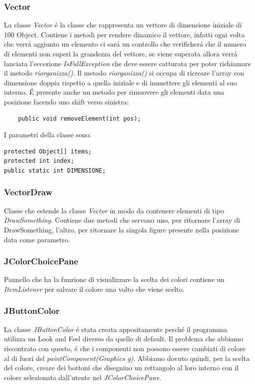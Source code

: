 \documentclass[a4paper,12pt,times,numbered,print,index]{article}
\begin{document}
\subsubsection{Vector}
La classe \textit{Vector} é la classe che rappresenta un vettore di dimensione iniziale di 100 Object. Contiene i metodi per rendere dinamico il vettore, infatti ogni volta che verrá aggiunto un elemento ci sará un controllo che verificherá che il numero di elementi non superi la grandezza del vettore, se viene superata allora verrá lanciata l'eccezione \textit{IsFullException} che deve essere catturata per poter richiamare il metodo \textit{riorganizza()}. Il metodo \textit{riorganizza()} si occupa di ricreare l'array con dimensione doppia rispetto a quella iniziale e di immettere gli elementi al suo interno.
É presente anche un metodo per rimuovere gli elementi data una posizione facendo uno shift verso sinistra:
\begin{lstlisting}
	public void removeElement(int pos);
\end{lstlisting}
I parametri della classe sono:
\begin{lstlisting}
protected Object[] items;
protected int index;
public static int DIMENSIONE;
\end{lstlisting}

\subsubsection{VectorDraw}
Classe che estende la classe \textit{Vector} in modo da contenere elementi di tipo \textit{DrawSomething}.
Contiene due metodi che servono uno, per ritornare l'array di DrawSomething, l'altro, per ritornare la singola figure presente nella posizione data come parametro.
\subsubsection{JColorChoicePane}
Pannello che ha la funzione di visualizzare la scelta dei colori contiene un \textit{ItemListener} per salvare il colore una volto che viene scelto.
\subsubsection{JButtonColor}
La classe \textit{JButtonColor} é stata creata appositamente perché il programma utilizza un Look and Feel diverso da quello di default. Il problema che abbiamo riscontrato con questo, é che i componenti non possono essere cambiati di colore al di fuori del \textit{paintComponent(Graphics g)}. Abbiamo dovuto quindi, per la scelta del colore, creare dei bottoni che disegnino un rettangolo al loro interno con il colore selezionato dall'utente nel \textit{JColorChoicePane}.
\end{document}
